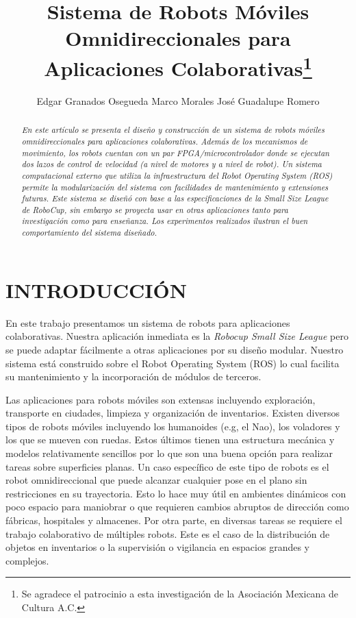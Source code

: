 \documentclass[twocolumn,10pt]{amrob}
\title{Sistema de Robots Móviles Omnidireccionales para Aplicaciones Colaborativas\thanks{Se agradece el patrocinio a esta investigación de la Asociación Mexicana de Cultura A.C.}}
\author{Edgar Granados Osegueda \qquad Marco Morales \qquad José Guadalupe Romero
    \affiliation{
    Departamento de Sistemas Digitales, ITAM\\
	Rio Hondo 1, Ciudad de México, 01080\\
	\{edgar.granados,marco.morales,jose.romerovelazquez\}@itam.mx
    }
}
\begin{document}
\graphicspath{ {./Figures/} }
\maketitle    

\begin{abstract}
{\it 
En este artículo se presenta el diseño y construcción de un sistema de robots móviles omnidireccionales para aplicaciones colaborativas. Además de los mecanismos de movimiento, los robots cuentan con un par FPGA/microcontrolador donde se ejecutan dos lazos de control de velocidad (a nivel de motores y a nivel de robot). Un sistema computacional externo que utiliza la infraestructura del Robot Operating System (ROS) permite la modularización del sistema con facilidades de mantenimiento y extensiones futuras. Este sistema se diseñó con base a las especificaciones de la Small Size League de RoboCup, sin embargo se proyecta usar en otras aplicaciones tanto para investigación como para enseñanza. Los experimentos realizados ilustran el buen comportamiento del sistema diseñado.
}



\end{abstract}



\section*{INTRODUCCIÓN}

En este trabajo presentamos un sistema de robots para aplicaciones colaborativas. Nuestra aplicación inmediata es la \textit{Robocup Small Size League} pero se puede adaptar fácilmente a otras aplicaciones por su diseño modular. Nuestro sistema está construido sobre el Robot Operating System (ROS) lo cual facilita su mantenimiento y la incorporación de módulos de terceros. 

Las aplicaciones para robots móviles son extensas incluyendo exploración, transporte en ciudades, limpieza y organización de inventarios. Existen diversos tipos de robots móviles incluyendo los humanoides (e.g, el Nao), los voladores y los que se mueven con ruedas. Estos últimos tienen una estructura mecánica y modelos relativamente sencillos \cite{corke2011robotics} por lo que son una  buena opción para realizar tareas sobre superficies  planas. Un caso específico de este tipo de robots es el robot omnidireccional que puede alcanzar cualquier pose en el plano sin restricciones en su trayectoria. Esto lo hace muy útil en ambientes dinámicos con poco espacio para maniobrar o que requieren cambios abruptos de dirección como fábricas, hospitales y almacenes. Por otra parte, en diversas tareas se requiere el trabajo colaborativo de múltiples robots. Este es el caso de la distribución de objetos en inventarios o la supervisión o vigilancia en espacios grandes y complejos. 
\end{document}
